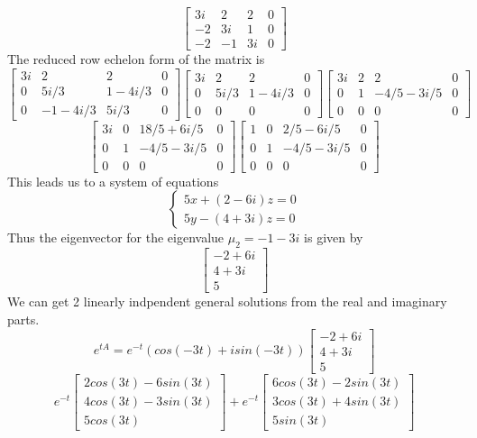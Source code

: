 \documentclass{article}
\begin{document}
$$\begin{bmatrix}
    3i & 2 & 2 & 0\\
    -2 & 3i & 1 & 0\\
    -2 & -1 & 3i & 0
\end{bmatrix} $$
The reduced row echelon form of the matrix is
$$ \begin{bmatrix}
    3i & 2 & 2 & 0\\
    0 & 5i/3 & 1-4i/3 & 0\\
    0 & -1-4i/3 & 5i/3 & 0
\end{bmatrix} \begin{bmatrix}
    3i & 2 & 2 & 0\\
    0 & 5i/3 & 1-4i/3 & 0\\
    0 & 0 & 0 & 0
\end{bmatrix}\begin{bmatrix}
    3i & 2 & 2 & 0\\
    0 & 1 & -4/5 - 3i/5 & 0\\
    0 & 0 & 0 & 0
\end{bmatrix} $$ $$ \begin{bmatrix}
    3i & 0 & 18/5 + 6i/5 & 0\\
    0 & 1 & -4/5 - 3i/5 & 0\\
    0 & 0 & 0 & 0
\end{bmatrix} \begin{bmatrix}
    1 & 0 & 2/5 - 6i/5 & 0\\
    0 & 1 & -4/5 - 3i/5 & 0\\
    0 & 0 & 0 & 0
\end{bmatrix}$$
This leads us to a system of equations 
$$\begin{cases}
    5x + (2 - 6i)z = 0\\
    5y - (4 + 3i)z = 0
\end{cases}$$
Thus the eigenvector for the eigenvalue $\mu_2 = -1-3i$ is given by
$$\begin{bmatrix}
    -2 + 6i\\
    4 + 3i\\
    5
\end{bmatrix} $$
We can get 2 linearly indpendent general solutions from the real and imaginary parts. 
$$ e^{tA} = e^{-t} (cos(-3t) + isin(-3t)) \begin{bmatrix}
    -2 + 6i\\
    4 + 3i\\
    5
\end{bmatrix}$$
$$ e^{-t}\begin{bmatrix}
    2cos(3t) - 6sin(3t)\\
    4cos(3t) - 3sin(3t)\\
    5cos(3t)
\end{bmatrix} + e^{-t}\begin{bmatrix}
    6cos(3t) - 2sin(3t) \\
    3cos(3t) + 4sin(3t)\\
    5sin(3t)
\end{bmatrix} $$
\end{document}
